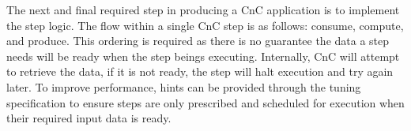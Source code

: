 The next and final required step in producing a CnC application is to implement the step logic.  The flow within a single CnC step is as follows: consume, compute, and produce.  This ordering is required as there is no guarantee the data a step needs will be ready when the step beings executing.  Internally, CnC will attempt to retrieve the data, if it is not ready, the step will halt execution and try again later.  To improve performance, hints can be provided through the tuning specification to ensure steps are only prescribed and scheduled for execution when their required input data is ready.

